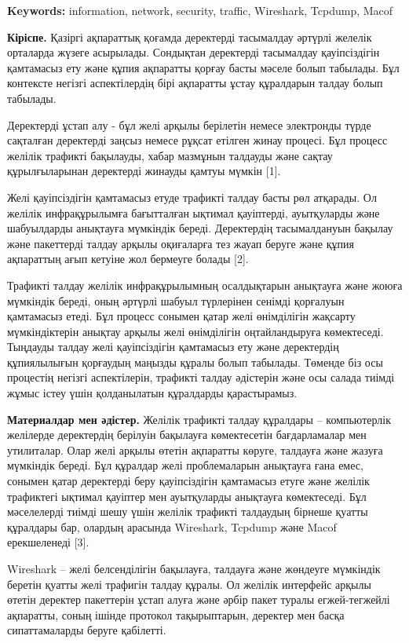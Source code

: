 {\bfseries Keywords:} information, network, security, traffic, Wireshark,
Tcpdump, Macof

\begin{multicols}{2}
{\bfseries Кіріспе.} Қазіргі ақпараттық қоғамда деректерді тасымалдау
әртүрлі желелік орталарда жүзеге асырылады. Сондықтан деректерді
тасымалдау қауіпсіздігін қамтамасыз ету және құпия ақпаратты қорғау
басты мәселе болып табылады. Бұл контексте негізгі аспектілердің бірі
ақпаратты ұстау құралдарын талдау болып табылады.

Деректерді ұстап алу - бұл желі арқылы берілетін немесе электронды түрде
сақталған деректерді заңсыз немесе рұқсат етілген жинау процесі. Бұл
процесс желілік трафикті бақылауды, хабар мазмұнын талдауды және сақтау
құрылғыларынан деректерді жинауды қамтуы мүмкін {[}1{]}.

Желі қауіпсіздігін қамтамасыз етуде трафикті талдау басты рөл атқарады.
Ол желілік инфрақұрылымға бағытталған ықтимал қауіптерді, ауытқуларды
және шабуылдарды анықтауға мүмкіндік береді. Деректердің тасымалдануын
бақылау және пакеттерді талдау арқылы оқиғаларға тез жауап беруге және
құпия ақпараттың ағып кетуіне жол бермеуге болады {[}2{]}.

Трафикті талдау желілік инфрақұрылымның осалдықтарын анықтауға және
жоюға мүмкіндік береді, оның әртүрлі шабуыл түрлерінен сенімді қорғалуын
қамтамасыз етеді. Бұл процесс сонымен қатар желі өнімділігін жақсарту
мүмкіндіктерін анықтау арқылы желі өнімділігін оңтайландыруға
көмектеседі. Тыңдауды талдау желі қауіпсіздігін қамтамасыз ету және
деректердің құпиялылығын қорғаудың маңызды құралы болып табылады.
Төменде біз осы процестің негізгі аспектілерін, трафикті талдау
әдістерін және осы салада тиімді жұмыс істеу үшін қолданылатын
құралдарды қарастырамыз.

{\bfseries Материалдар мен әдістер.} Желілік трафикті талдау құралдары --
компьютерлік желілерде деректердің берілуін бақылауға көмектесетін
бағдарламалар мен утилиталар. Олар желі арқылы өтетін ақпаратты көруге,
талдауға және жазуға мүмкіндік береді. Бұл құралдар желі проблемаларын
анықтауға ғана емес, сонымен қатар деректерді беру қауіпсіздігін
қамтамасыз етуге және желілік трафиктегі ықтимал қауіптер мен
ауытқуларды анықтауға көмектеседі. Бұл мәселелерді тиімді шешу үшін
желілік трафикті талдаудың бірнеше қуатты құралдары бар, олардың
арасында Wireshark, Tcpdump және Macof ерекшеленеді {[}3{]}.

Wireshark -- желі белсенділігін бақылауға, талдауға және жөндеуге
мүмкіндік беретін қуатты желі трафигін талдау құралы. Ол желілік
интерфейс арқылы өтетін деректер пакеттерін ұстап алуға және әрбір пакет
туралы егжей-тегжейлі ақпаратты, соның ішінде протокол тақырыптарын,
деректер мен басқа сипаттамаларды беруге қабілетті.


\end{multicols}

